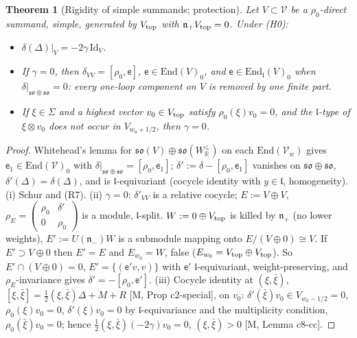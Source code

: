\documentclass[10pt]{article}
\newtheorem{theorem}{Theorem}[section]
\theoremstyle{definition}
\newcommand{\V}{\mathcal V}
\newcommand{\End}{\mathrm{End}}
\newcommand{\Wp}{W_{\mathbb R}^\perp}
\newcommand{\lf}{\mathfrak l}
\newcommand{\ee}{\mathsf e}
\begin{document}
\begin{theorem}[Rigidity of simple summands; protection]\label{thm:rigid}
Let $V\subset\V$ be a $\rho_0$-direct summand, simple, generated by $V_{\rm top}$ with $\mathfrak n_+V_{\rm top}=0$. Under (H0):
\begin{itemize}
\item[(i)] $\delta(\Delta)|_V=-2\gamma\,\mathrm{Id}_V$.
\item[(ii)] If $\gamma=0$, then $\delta_{VV}=[\rho_0,\ee]$, $\ee\in\End(V)_0$, and $\ee\in\End_{\lf}(V)_0$ when $\delta|_{\mathfrak{so}\oplus\mathfrak{so}}=0$: every one-loop component on $V$ is removed by one finite part.
\item[(iii)] If $\xi\in\Sigma$ and a highest vector $v_0\in V_{\rm top}$ satisfy $\rho_0(\xi)v_0=0$, and the $\lf$-type of $\xi\otimes v_0$ does not occur in $V_{w_0+1/2}$, then $\gamma=0$.
\end{itemize}
\end{theorem}
\begin{proof}
Whitehead's lemma for $\mathfrak{so}(V)\oplus\mathfrak{so}(\Wp)$ on each $\End(\V_w)$ gives $\ee_1\in\End(\V)_0$ with $\delta|_{\mathfrak{so}\oplus\mathfrak{so}}=[\rho_0,\ee_1]$; $\delta':=\delta-[\rho_0,\ee_1]$ vanishes on $\mathfrak{so}\oplus\mathfrak{so}$, $\delta'(\Delta)=\delta(\Delta)$, and is $\lf$-equivariant (cocycle identity with $y\in\lf$, homogeneity). (i) Schur and (R7). (ii) $\gamma=0$: $\delta'_{VV}$ is a relative cocycle; $E:=V\oplus V$, $\rho_E=\begin{pmatrix}\rho_0&\delta'\\0&\rho_0\end{pmatrix}$ is a module, $\lf$-split. $W:=0\oplus V_{\rm top}$ is killed by $\mathfrak n_+$ (no lower weights), $E':=U(\mathfrak n_-)W$ is a submodule mapping onto $E/(V\oplus0)\cong V$. If $E'\supset V\oplus0$ then $E'=E$ and $E_{w_0}=W$, false ($E_{w_0}=V_{\rm top}\oplus V_{\rm top}$). So $E'\cap(V\oplus0)=0$, $E'=\{(\ee'v,v)\}$ with $\ee'$ $\lf$-equivariant, weight-preserving, and $\rho_E$-invariance gives $\delta'=-[\rho_0,\ee']$. (iii) Cocycle identity at $(\xi,\bar\xi)$, $[\xi,\bar\xi]=\tfrac12(\xi,\bar\xi)\Delta+M+R$ [M, Prop c2-special], on $v_0$: $\delta'(\bar\xi)v_0\in V_{w_0-1/2}=0$, $\rho_0(\xi)v_0=0$, $\delta'(\xi)v_0=0$ by $\lf$-equivariance and the multiplicity condition, $\rho_0(\bar\xi)v_0=0$; hence $\tfrac12(\xi,\bar\xi)(-2\gamma)v_0=0$, $(\xi,\bar\xi)>0$ [M, Lemma c8-cc].
\end{proof}
\end{document}
